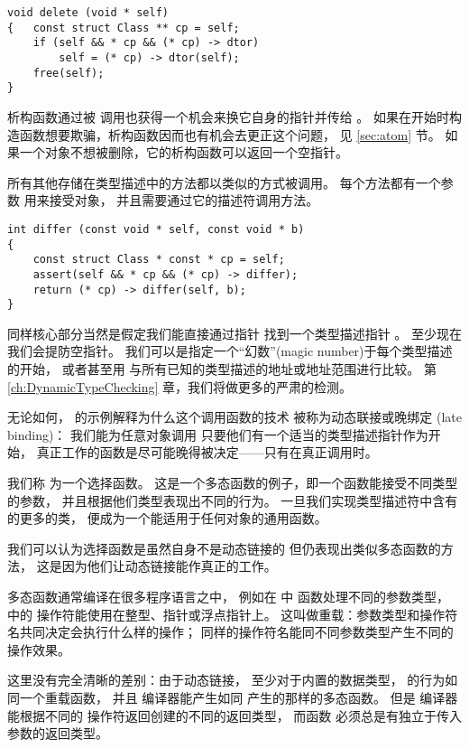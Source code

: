 \begin{lstlisting}
void delete (void * self)
{   const struct Class ** cp = self;
    if (self && * cp && (* cp) -> dtor)
        self = (* cp) -> dtor(self);
    free(self);
}
\end{lstlisting}

析构函数通过被
 调用也获得一个机会来换它自身的指针并传给
。
如果在开始时构造函数想要欺骗，析构函数因而也有机会去更正这个问题，
见 \ref{sec:atom} 节。
如果一个对象不想被删除，它的析构函数可以返回一个空指针。

所有其他存储在类型描述中的方法都以类似的方式被调用。
每个方法都有一个参数  用来接受对象，
并且需要通过它的描述符调用方法。
\begin{lstlisting}
int differ (const void * self, const void * b)
{
    const struct Class * const * cp = self;
    assert(self && * cp && (* cp) -> differ);
    return (* cp) -> differ(self, b);
}
\end{lstlisting}

同样核心部分当然是假定我们能直接通过指针 
找到一个类型描述指针 。
至少现在我们会提防空指针。
我们可以是指定一个“幻数”(magic number)于每个类型描述的开始，
或者甚至用  与所有已知的类型描述的地址或地址范围进行比较。
第 \ref{ch:DynamicTypeChecking} 章，我们将做更多的严肃的检测。

无论如何， 的示例解释为什么这个调用函数的技术
被称为动态联接或晚绑定 (late binding)：
我们能为任意对象调用 
只要他们有一个适当的类型描述指针作为开始，
真正工作的函数是尽可能晚得被决定——只有在真正调用时。

我们称  为一个选择函数。
这是一个多态函数的例子，即一个函数能接受不同类型的参数，
并且根据他们类型表现出不同的行为。
一旦我们实现类型描述符中含有  的更多的类，
 便成为一个能适用于任何对象的通用函数。

我们可以认为选择函数是虽然自身不是动态链接的
但仍表现出类似多态函数的方法，
这是因为他们让动态链接能作真正的工作。

多态函数通常编译在很多程序语言之中，
例如在  中  函数处理不同的参数类型，
 中的 \ccode{+} 操作符能使用在整型、指针或浮点指针上。
这叫做重载：参数类型和操作符名共同决定会执行什么样的操作；
同样的操作符名能同不同参数类型产生不同的操作效果。

这里没有完全清晰的差别：由于动态链接，
至少对于内置的数据类型， 的行为如同一个重载函数，
并且  编译器能产生如同 \ccode{+} 产生的那样的多态函数。
但是  编译器能根据不同的
\ccode{+} 操作符返回创建的不同的返回类型，
而函数  必须总是有独立于传入参数的返回类型。

